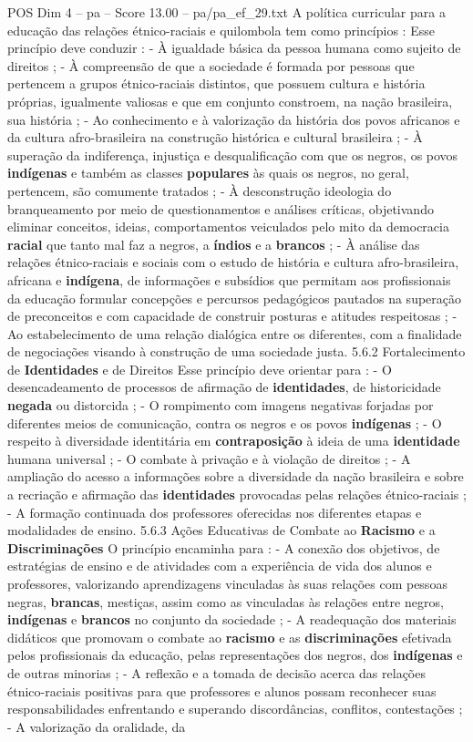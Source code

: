 \begin{textsample}{POS Dim 4 – pa – Score 13.00 – pa/pa\_ef\_29.txt}
A política curricular para a educação das relações étnico-raciais e quilombola tem como princípios : Esse princípio deve conduzir : - À igualdade básica da pessoa humana como sujeito de direitos ; - À compreensão de que a sociedade é formada por pessoas que pertencem a grupos étnico-raciais distintos, que possuem cultura e história próprias, igualmente valiosas e que em conjunto constroem, na nação brasileira, sua história ; - Ao conhecimento e à valorização da história dos povos africanos e da cultura afro-brasileira na construção histórica e cultural brasileira ; - À superação da indiferença, injustiça e desqualificação com que os negros, os povos \textbf{indígenas} e também as classes \textbf{populares} às quais os negros, no geral, pertencem, são comumente tratados ; - À desconstrução ideologia do branqueamento por meio de questionamentos e análises críticas, objetivando eliminar conceitos, ideias, comportamentos veiculados pelo mito da democracia \textbf{racial} que tanto mal faz a negros, a \textbf{índios} e a \textbf{brancos} ; - À análise das relações étnico-raciais e sociais com o estudo de história e cultura afro-brasileira, africana e \textbf{indígena}, de informações e subsídios que permitam aos profissionais da educação formular concepções e percursos pedagógicos pautados na superação de preconceitos e com capacidade de construir posturas e atitudes respeitosas ; - Ao estabelecimento de uma relação dialógica entre os diferentes, com a finalidade de negociações visando à construção de uma sociedade justa. 5.6.2 Fortalecimento de \textbf{Identidades} e de Direitos Esse princípio deve orientar para : - O desencadeamento de processos de afirmação de \textbf{identidades}, de historicidade \textbf{negada} ou distorcida ; - O rompimento com imagens negativas forjadas por diferentes meios de comunicação, contra os negros e os povos \textbf{indígenas} ; - O respeito à diversidade identitária em \textbf{contraposição} à ideia de uma \textbf{identidade} humana universal ; - O combate à privação e à violação de direitos ; - A ampliação do acesso a informações sobre a diversidade da nação brasileira e sobre a recriação e afirmação das \textbf{identidades} provocadas pelas relações étnico-raciais ; - A formação continuada dos professores oferecidas nos diferentes etapas e modalidades de ensino. 5.6.3 Ações Educativas de Combate ao \textbf{Racismo} e a \textbf{Discriminações} O princípio encaminha para : - A conexão dos objetivos, de estratégias de ensino e de atividades com a experiência de vida dos alunos e professores, valorizando aprendizagens vinculadas às suas relações com pessoas negras, \textbf{brancas}, mestiças, assim como as vinculadas às relações entre negros, \textbf{indígenas} e \textbf{brancos} no conjunto da sociedade ; - A readequação dos materiais didáticos que promovam o combate ao \textbf{racismo} e as \textbf{discriminações} efetivada pelos profissionais da educação, pelas representações dos negros, dos \textbf{indígenas} e de outras minorias ; - A reflexão e a tomada de decisão acerca das relações étnico-raciais positivas para que professores e alunos possam reconhecer suas responsabilidades enfrentando e superando discordâncias, conflitos, contestações ; - A valorização da oralidade, da 
\end{textsample}
